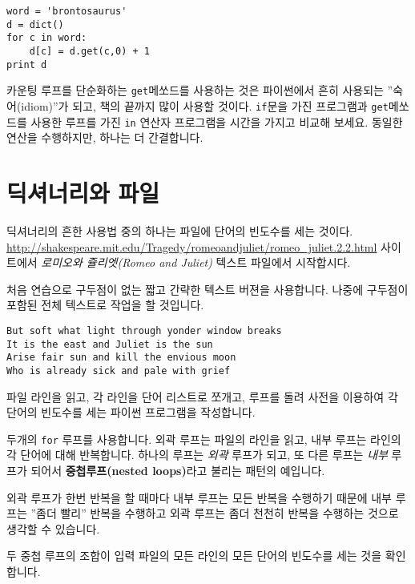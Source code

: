\beforeverb
\begin{verbatim}
word = 'brontosaurus'
d = dict()
for c in word:
    d[c] = d.get(c,0) + 1
print d
\end{verbatim}
\afterverb
%

카운팅 루프를 단순화하는 {\tt get}메쏘드를 사용하는 것은 파이썬에서 흔히 사용되는 ''숙어(idiom)''가 되고, 책의 끝까지 많이 사용할 것이다.
{\tt if}문을 가진 프로그램과 {\tt get}메쏘드를 사용한 루프를 가진 {\tt in} 연산자 프로그램을 시간을 가지고 비교해 보세요.
동일한 연산을 수행하지만, 하나는 더 간결합니다.


\section{딕셔너리와 파일}

딕셔너리의 흔한 사용법 중의 하나는 파일에 단어의 빈도수를 세는 것이다. \url{http://shakespeare.mit.edu/Tragedy/romeoandjuliet/romeo_juliet.2.2.html}
사이트에서 \emph{로미오와 쥴리엣(Romeo and Juliet)} 텍스트 파일에서 시작합시다.

처음 연습으로 구두점이 없는 짧고 간략한 텍스트 버젼을 사용합니다. 나중에 구두점이 포함된 전체 텍스트로 작업을 할 것입니다.

\beforeverb
\begin{verbatim}
But soft what light through yonder window breaks
It is the east and Juliet is the sun
Arise fair sun and kill the envious moon
Who is already sick and pale with grief
\end{verbatim}
\afterverb
%

파일 라인을 읽고, 각 라인을 단어 리스트로 쪼개고, 루프를 돌려 사전을 이용하여 각 단어의 빈도수를 세는 파이썬 프로그램을 작성합니다.


두개의 {\tt for} 루프를 사용합니다. 외곽 루프는 파일의 라인을 읽고, 내부 루프는 라인의 각 단어에 대해 반복합니다.
하나의 루프는 \emph{외곽} 루프가 되고, 또 다른 루프는 \emph{내부} 루프가 되어서 {\bf 중첩루프(nested loops)}라고 불리는 패턴의 예입니다.

외곽 루프가 한번 반복을 할 때마다 내부 루프는 모든 반복을 수행하기 때문에 내부 루프는 ''좀더 빨리'' 반복을 수행하고 외곽 루프는 
좀더 천천히 반복을 수행하는 것으로 생각할 수 있습니다.


두 중첩 루프의 조합이 입력 파일의 모든 라인의 모든 단어의 빈도수를 세는 것을 확인합니다.

